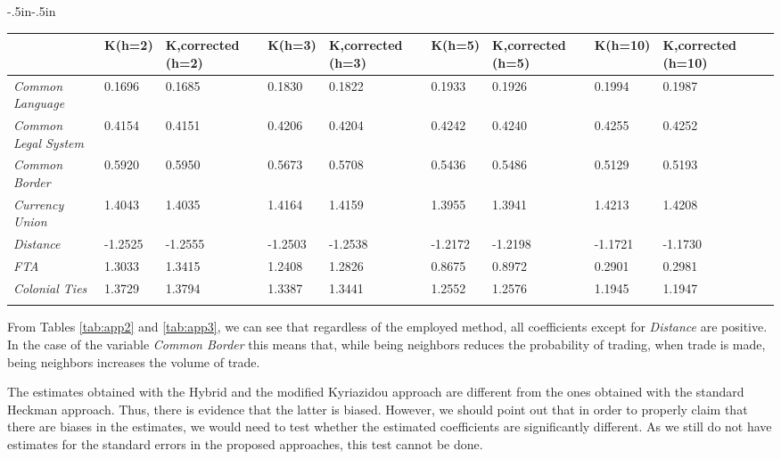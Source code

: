 \begin{sidewaystable}
    \begin{adjustwidth}{-.5in}{-.5in}
        \small
        \centering
        \begin{tabular}{p{4cm}p{1.8cm}p{1.8cm}p{1.8cm}p{1.8cm}p{1.8cm}p{1.8cm}p{1.8cm}p{1.8cm}p{1.8cm}}
          \hline
           \quad & K(h=2)  & K,corrected (h=2)  & K(h=3)  & K,corrected (h=3)  & K(h=5)  & K,corrected (h=5)  & K(h=10)  & K,corrected (h=10)\\
           \hline
            \textit{Common Language}  & 0.1696 & 0.1685 & 0.1830 & 0.1822& 0.1933& 0.1926& 0.1994& 0.1987\\
            \textit{Common Legal System}   & 0.4154 & 0.4151 & 0.4206 & 0.4204& 0.4242& 0.4240 & 0.4255& 0.4252\\
            \textit{Common Border}  & 0.5920 & 0.5950 & 0.5673 & 0.5708& 0.5436& 0.5486& 0.5129& 0.5193\\
            \textit{Currency Union}  & 1.4043 & 1.4035 & 1.4164& 1.4159& 1.3955& 1.3941& 1.4213& 1.4208\\
            \textit{Distance}  &  -1.2525& -1.2555 & -1.2503& -1.2538& -1.2172& -1.2198& -1.1721& -1.1730\\
            \textit{FTA} & 1.3033 & 1.3415 & 1.2408& 1.2826& 0.8675& 0.8972& 0.2901& 0.2981\\
            \textit{Colonial Ties} & 1.3729 & 1.3794 & 1.3387 & 1.3441& 1.2552& 1.2576& 1.1945& 1.1947\\
            &  &  &  & & & & & \\
            \hline
        \end{tabular}
        \caption{\footnotesize{Estimates for the second stage Equation \ref{eq:app2}. We denote by Kyriazidou by $K$. }}
        \label{tab:app3}
    \end{adjustwidth}
\end{sidewaystable}

From Tables \ref{tab:app2} and \ref{tab:app3}, we can see that regardless of the employed method, all coefficients except for \textit{Distance} are positive. In the case of the variable \textit{Common Border} this means that, while being neighbors reduces the probability of trading, when trade is made, being neighbors increases the volume of trade. 

The estimates obtained with the Hybrid and the modified Kyriazidou approach are different from the ones obtained with the standard Heckman approach. Thus, there is evidence that the latter is biased. However, we should point out that in order to properly claim that there are biases in the estimates, we would need to test whether the estimated coefficients are significantly different. As we still do not have estimates for the standard errors in the proposed approaches, this test cannot be done.

